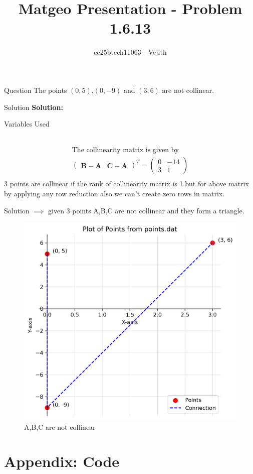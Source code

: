 \documentclass{beamer}
\title{Matgeo Presentation - Problem 1.6.13}
\author{ee25btech11063 - Vejith}
\numberwithin{equation}{section}
\providecommand{\brak}[1]{\ensuremath{\left(#1\right)}}
\theoremstyle{remark}
\newcommand{\myvec}[1]{\ensuremath{\begin{pmatrix}#1\end{pmatrix}}}
\let\vec\mathbf
\begin{document}
\frame{\titlepage}
\begin{frame}{Question}
The points $\brak{0,5}$,$\brak{0,-9}$ and $\brak{3,6}$ are  not collinear.
\end{frame}

\begin{frame}{Solution}
\textbf{Solution: }\\
\begin{table}[h!]    
  \centering
  
  \caption{Variables Used}
  \label{}
\end{table}\\
\begin{align}
\text{The collinearity matrix is given by}\\
\myvec{
   \vec{B}-\vec{A} & \vec{C}-\vec{A}
 }^T = \myvec{
   0 & -14 \\
   3 & 1
   }\\
 \end{align}
 3 points are collinear if the rank of collinearity matrix is 1.but  for above matrix by applying any row reduction also we can't create zero rows in matrix.

\end{frame}

\begin{frame}{Solution}
    $\implies$ given 3 points A,B,C are not collinear and they form a triangle.
 \begin{figure}[h!]
   \centering
   \includegraphics[width=0.7\linewidth]{figs/01.png}
   \caption{A,B,C are not collinear}
   \label{}
\end{figure}
\end{frame}
\section*{Appendix: Code}
\end{document}
